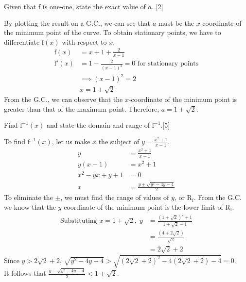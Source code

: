 \documentclass[12pt, a4 paper]{article}
\begin{document}
\begin{outline}[enumerate]
 \2 Given that f is one-one, state the exact value of \(a\). \hfill[2]
 \begin{answer}
  By plotting the result on a G.C., we can see that \(a\) must be the \(x\)-coordinate of the minimum point of the curve. To obtain stationary points, we have to differentiate \(\textrm{f}(x)\) with respect to \(x\).
  \begin{align*}
   \textrm{f}(x)  & =x+1+\frac{2}{x-1}                                       \\
   \textrm{f}'(x) & =1-\frac{2}{{(x-1)}^2}=0 \textrm{   for stationary points} \\
                  & \implies {(x-1)}^2=2                                       \\
                  & x=1\pm \sqrt{2}
  \end{align*}
  From the G.C., we can observe that the \(x\)-coordinate of the minimum point is greater than that of the maximum point. Therefore, \(a=1+\sqrt{2}\).
 \end{answer}
 \2 Find \(\textrm{f}^{-1}(x)\) and state the domain and range of \(\textrm{f}^{-1}\).\hfill[5]
 \begin{answer}
  To find \(\textrm{f}^{-1}(x)\), let us make \(x\) the subject of \(y=\frac{x^2+1}{x-1}\).
  \begin{align*}
   y          & =\frac{x^2+1}{x-1}               \\
   y(x-1)     & =x^2+1                           \\
   x^2-yx+y+1 & =0                               \\
   x          & = \frac{y\pm \sqrt{y^2-4y-4}}{2}
  \end{align*}
  To eliminate the \(\pm \), we must find the range of values of \(y\), or \(\textrm{R}_{\textrm{f}}\). From the G.C. we know that the \(y\)-coordinate of the minimum point is the lower limit of \(\textrm{R}_{\textrm{f}}\).
  \begin{align*}
   \textrm{Substituting }x=1+\sqrt{2},\; y & =\frac{{(1+\sqrt{2})}^2+1}{1+\sqrt{2}-1} \\
                                           & = \frac{(4+2\sqrt{2})}{\sqrt{2}}       \\
                                           & = 2\sqrt{2}+2
  \end{align*}
  Since \(y>2\sqrt{2}+2\), \(\sqrt{y^2-4y-4}>\sqrt{{(2\sqrt{2}+2)}^2-4(2\sqrt{2}+2)-4}=0\).\\
  It follows that \(\frac{y-\sqrt{y^2-4y-4}}{2}<1+\sqrt{2}\).\\

\end{answer}
\end{outline}
\end{document}
